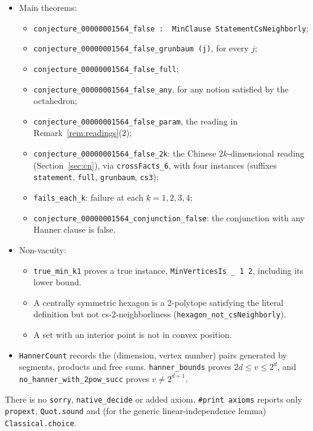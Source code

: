 \documentclass[11pt]{article}
\theoremstyle{definition}
\theoremstyle{remark}
\begin{document}
\begin{itemize}
\begin{itemize}
  \item for every subset $S$ (every sublist), that if $S$ is nonempty and antipodal-free,
  then the maximizers of $\sum S$ are exactly $S$.
  \end{itemize}
  \texttt{full\_of\_sublists} transfers the last check from sublists to arbitrary
  subsets.
\item Main theorems:
  \begin{itemize}
  \item \texttt{conjecture\_00000001564\_false : \textlnot\ MinClause StatementCsNeighborly};
  \item \texttt{conjecture\_00000001564\_false\_grunbaum (j)}, for every $j$;
  \item \texttt{conjecture\_00000001564\_false\_full};
  \item \texttt{conjecture\_00000001564\_false\_any}, for any notion satisfied by the octahedron;
  \item \texttt{conjecture\_00000001564\_false\_param}, the reading in Remark~\ref{rem:readings}(2);
  \item \texttt{conjecture\_00000001564\_false\_2k}: the Chinese $2k$-dimensional reading
  (Section~\ref{sec:cn}), via \texttt{crossFacts\_6}, with four instances (suffixes
  \texttt{statement}, \texttt{full}, \texttt{grunbaum}, \texttt{cs3});
  \item \texttt{fails\_each\_k}: failure at each $k=1,2,3,4$;
  \item \texttt{conjecture\_00000001564\_conjunction\_false}: the conjunction with any Hanner clause is false.
  \end{itemize}
\item Non-vacuity:
  \begin{itemize}
  \item \texttt{true\_min\_k1} proves a true instance, \texttt{MinVerticesIs \_ 1 2}, including its lower bound.
  \item A centrally symmetric hexagon is a 2-polytope satisfying the literal definition
  but not cs-$2$-neighborliness (\texttt{hexagon\_not\_csNeighborly}).
  \item A set with an interior point is not in convex position.
  \end{itemize}
\item \texttt{HannerCount} records the (dimension, vertex number) pairs generated by
segments, products and free sums. \texttt{hanner\_bounds} proves $2d\le v\le2^d$, and
\texttt{no\_hanner\_with\_2pow\_succ} proves $v\ne2^{d+1}$.
\end{itemize}
There is no \texttt{sorry}, \texttt{native\_decide} or added axiom. \texttt{\#print axioms}
reports only \texttt{propext}, \texttt{Quot.sound} and (for the generic linear-independence
lemma) \texttt{Classical.choice}.
\end{document}
